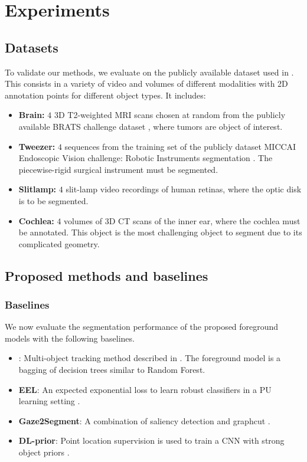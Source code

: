\section{Experiments}
\label{sec:exps}
\subsection{Datasets}
To validate our methods, we evaluate on the publicly available dataset used in \cite{lejeune18}.
This consists in a variety of video and volumes of different modalities with 2D annotation points for different object types.
It includes:
\begin{itemize}
\item \textbf{Brain:} \(4\) 3D T2-weighted MRI scans chosen at random from the publicly available BRATS challenge dataset \cite{menze15}, where tumors are object of interest.
\item \textbf{Tweezer:} \(4\) sequences from the training set of the publicly dataset MICCAI Endoscopic Vision challenge: Robotic Instruments segmentation \cite{endochal}. The piecewise-rigid surgical instrument must be segmented.
\item \textbf{Slitlamp:} \(4\) slit-lamp video recordings of human retinas, where the optic disk is to be segmented.
\item \textbf{Cochlea:} \(4\) volumes of 3D CT scans of the inner ear, where the cochlea must be annotated. This object is the most challenging object to segment due to its complicated geometry.
\end{itemize}

\subsection{Proposed methods and baselines}
\label{sec:orge9e46ac}
\subsubsection{Baselines}
\label{sec:orgb4303b5}

We now evaluate the segmentation performance of the proposed foreground models with the following baselines.
\begin{itemize}
\item \ksp: Multi-object tracking method described in \cite{lejeune18}.
The foreground model is a bagging of decision trees similar to Random Forest.
\item \textbf{EEL}: An expected exponential loss to learn robust classifiers in a PU learning setting \cite{lejeune17}.
\item \textbf{Gaze2Segment}: A combination of saliency detection and graphcut \cite{khosravan16}.
\item \textbf{DL-prior}: Point location supervision is used to train a CNN with strong object priors \cite{bearman16}.
\end{itemize}

